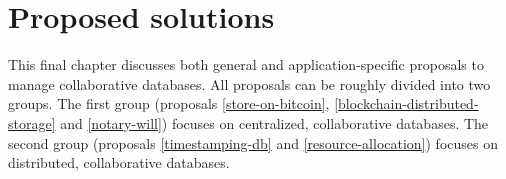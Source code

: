 \chapter{Proposed solutions}

\iffalse
- general introduction of the several propsed methods, maybe putting them in two categories
\fi

This final chapter discusses both general and application-specific proposals to manage collaborative databases. All proposals can be roughly divided into two groups. The first group (proposals \ref{store-on-bitcoin}, \ref{blockchain-distributed-storage} and \ref{notary-will}) focuses on centralized, collaborative databases. The second group (proposals \ref{timestamping-db} and \ref{resource-allocation}) focuses on distributed, collaborative databases.


\newpage

\newpage

\newpage

\newpage

\newpage

\iffalse
other examples to discuss:

- resource allocation system based on namecoin
\fi